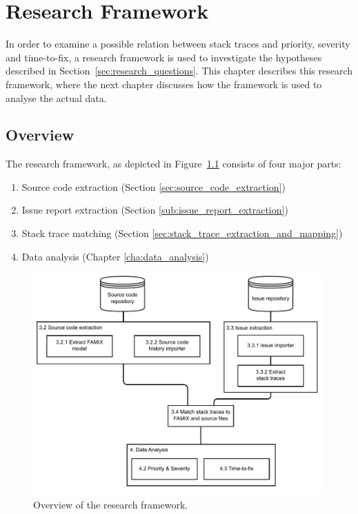 
\chapter{Research Framework} %
\label{cha:research_framework}
In order to examine a possible relation between stack traces and priority, severity and time-to-fix, a research framework is used to investigate the hypotheses described in Section~\ref{sec:research_questions}. This chapter describes this research framework, where the next chapter discusses how the framework is used to analyse the actual data.

\section{Overview} %
The research framework, as depicted in Figure~\ref{fig:research_framework} consists of four major parts:

\begin{enumerate}
	\item Source code extraction (Section \ref{sec:source_code_extraction})
	\item Issue report extraction (Section \ref{sub:issue_report_extraction})
	\item Stack trace matching (Section \ref{sec:stack_trace_extraction_and_mapping})
	\item Data analysis (Chapter \ref{cha:data_analysis})
\end{enumerate}

\begin{figure}[!ht]
	\centering
		\includegraphics[width=1\textwidth]{img/research_framework.pdf}
	\caption{Overview of the research framework.}
	\label{fig:research_framework}
\end{figure}


